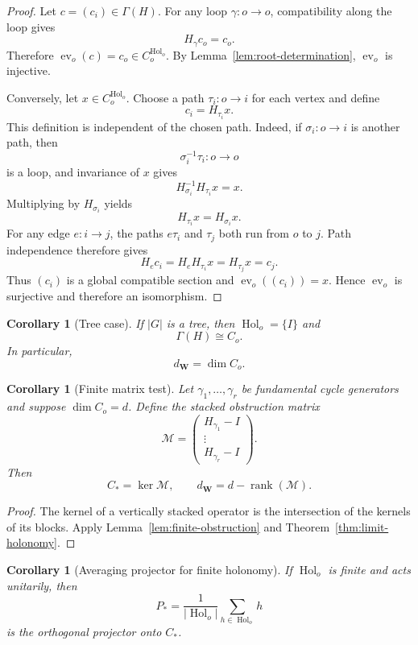 \documentclass[11pt,letterpaper]{article}
\newcommand{\Workspace}{\mathbf W}
\newcommand{\Hol}{\operatorname{Hol}}
\DeclareMathOperator{\ev}{ev}
\theoremstyle{plain}
\newtheorem{corollary}[theorem]{Corollary}
\theoremstyle{definition}
\begin{document}
\begin{proof}
Let \(c=(c_i)\in\Gamma(H)\). For any loop \(\gamma:o\to o\), compatibility
along the loop gives
\[
H_\gamma c_o=c_o.
\]
Therefore \(\ev_o(c)=c_o\in C_o^{\Hol_o}\). By
Lemma~\ref{lem:root-determination}, \(\ev_o\) is injective.

Conversely, let \(x\in C_o^{\Hol_o}\). Choose a path
\(\tau_i:o\to i\) for each vertex and define
\[
c_i=H_{\tau_i}x.
\]
This definition is independent of the chosen path. Indeed, if
\(\sigma_i:o\to i\) is another path, then
\[
\sigma_i^{-1}\tau_i:o\to o
\]
is a loop, and invariance of \(x\) gives
\[
H_{\sigma_i}^{-1}H_{\tau_i}x=x.
\]
Multiplying by \(H_{\sigma_i}\) yields
\[
H_{\tau_i}x=H_{\sigma_i}x.
\]
For any edge \(e:i\to j\), the paths \(e\tau_i\) and \(\tau_j\) both run
from \(o\) to \(j\). Path independence therefore gives
\[
H_ec_i
=H_eH_{\tau_i}x
=H_{\tau_j}x
=c_j.
\]
Thus \((c_i)\) is a global compatible section and \(\ev_o((c_i))=x\).
Hence \(\ev_o\) is surjective and therefore an isomorphism.
\end{proof}

\begin{corollary}[Tree case]\label{cor:tree-core}
If \(|G|\) is a tree, then \(\Hol_o=\{I\}\) and
\[
\Gamma(H)\cong C_o.
\]
In particular,
\[
d_{\Workspace}=\dim C_o.
\]
\end{corollary}

\begin{corollary}[Finite matrix test]\label{cor:finite-matrix-test}
Let \(\gamma_1,\ldots,\gamma_r\) be fundamental cycle generators and suppose
\(\dim C_o=d\). Define the stacked obstruction matrix
\[
\mathcal M
=
\begin{pmatrix}
H_{\gamma_1}-I\\
\vdots\\
H_{\gamma_r}-I
\end{pmatrix}.
\]
Then
\[
\boxed{
C_*=\ker\mathcal M,
\qquad
d_{\Workspace}=d-\operatorname{rank}(\mathcal M).
}
\]
\end{corollary}

\begin{proof}
The kernel of a vertically stacked operator is the intersection of the kernels
of its blocks. Apply Lemma~\ref{lem:finite-obstruction} and
Theorem~\ref{thm:limit-holonomy}.
\end{proof}

\begin{corollary}[Averaging projector for finite holonomy]\label{cor:averaging-projector}
If \(\Hol_o\) is finite and acts unitarily, then
\[
P_*=
\frac{1}{|\Hol_o|}
\sum_{h\in\Hol_o}h
\]
is the orthogonal projector onto \(C_*\).
\end{corollary}
\end{document}
